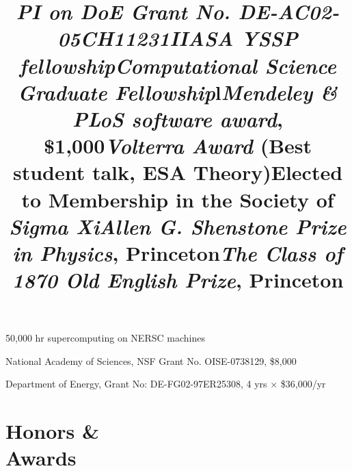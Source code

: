 \documentclass[margin]{res}
\begin{document}
\begin{resume}
\title{\emph{PI on DoE Grant No. DE-AC02-05CH11231}}
\begin{position} 
50,000 hr supercomputing on NERSC machines
  \vspace{-.25cm}
\end{position}

\title{\emph{IIASA YSSP fellowship}}
\begin{position} 
  National Academy of Sciences, NSF Grant No. OISE-0738129, \$8,000
  \vspace{-.25cm}
\end{position}

\title{\emph{Computational Science Graduate Fellowship}}
\begin{position} 
  Department of Energy, Grant No: DE-FG02-97ER25308, 4 yrs $\times$ \$36,000/yr
  \vspace{-.25cm}
\end{position}


\section{Honors \& \\ Awards}
\begin{format}
\title{l}\\
\body
\end{format}


\title{\emph{Mendeley \& PLoS software award}, \$1,000}
\begin{position} \vspace{-.7cm} \end{position}

\title{\emph{Volterra Award} (Best student talk, ESA Theory)}
\begin{position} \vspace{-.7cm} \end{position}

\title{Elected to Membership in the Society of \emph{Sigma Xi}}
\begin{position}   \vspace{-.7cm} \end{position}

\title{\emph{Allen G. Shenstone Prize in Physics}, Princeton}
\begin{position}   \vspace{-.7cm} \end{position}

\title{\emph{The Class of 1870 Old English Prize},  Princeton}
\begin{position}   \vspace{-.7cm} \end{position}


\end{resume}
\end{document}
